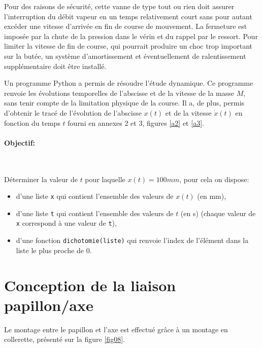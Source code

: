 Pour des raisons de sécurité, cette vanne de type tout ou rien doit assurer l’interruption du débit vapeur en un temps relativement court sans pour autant excéder une vitesse d’arrivée en fin de course de mouvement. La fermeture est imposée par la chute de la pression dans le vérin et du rappel par le ressort.
Pour limiter la vitesse de fin de course, qui pourrait produire un choc trop important sur la butée, un système d'amortissement et éventuellement de ralentissement supplémentaire doit être installé.

Un programme Python a permis de résoudre l'étude dynamique. Ce programme renvoie les évolutions temporelles de l'abscisse et de la vitesse de la masse $M$, sans tenir compte de la limitation physique de la course. Il a, de plus, permis d'obtenir le tracé de l’évolution de l’abscisse $x(t)$ et de la vitesse $\dot{x}(t)$ en fonction du temps $t$ fourni en annexes 2 et 3, figures \ref{a2} et \ref{a3}.


\paragraph{Objectif:} ~\

Déterminer la valeur de $t$ pour laquelle $x(t)=100mm$, pour cela on dispose:
\begin{itemize}
 \item d'une liste \verb?x? qui contient l'ensemble des valeurs de $x(t)$ (en mm),
 \item d'une liste \verb?t? qui contient l'ensemble des valeurs de $t$ (en s) (chaque valeur de \verb?x? correspond à une valeur de \verb?t?),
 \item d'une fonction \verb?dichotomie(liste)? qui renvoie l'index de l'élément dans la liste le plus proche de $0$.
\end{itemize}


\section{Conception de la liaison papillon/axe}

Le montage entre le papillon et l'axe est effectué grâce à un montage en collerette, présenté sur la figure \ref{fig08}.

